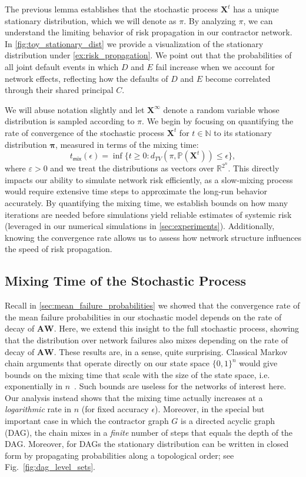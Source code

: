 \documentclass[mnsc,nonblindrev]{informs3}
\newcommand{\NN}{\mathbb{N}}
\renewcommand{\Pr}{\mathbb{P}}
\newcommand{\Xvec}{\mathbf{X}}
\newcommand{\A}{\mathbf{A}}
\newcommand{\W}{\mathbf{W}}
\newcommand{\pvec}{\mathbf{\pi}}
\newcommand{\tmix}{t_{\textsf{mix}}}
\begin{document}
    The previous lemma establishes that the stochastic process $\Xvec^t$ has a unique stationary distribution, which we will denote as $\pi$.  By analyzing $\pi$, we can understand the limiting behavior of risk propagation in our contractor network. In \cref{fig:toy_stationary_dist} we provide a visualization of the stationary distribution under \cref{ex:risk_propagation}.  We point out that the probabilities of all joint default events in which $D$ and $E$ fail increase when we account for network effects, reflecting how the defaults of $D$ and $E$ become correlated through their shared principal $C$.
    

    We will abuse notation slightly and let $\Xvec^\infty$ denote a random variable whose distribution is sampled according to $\pi$.  We begin by focusing on quantifying the rate of convergence of the stochastic process $\Xvec^{t}$ for $t \in \NN$ to its stationary distribution $\pvec$, measured in terms of the mixing time:
    \[
    \tmix(\epsilon) = \inf\{t \geq 0: d_{TV}(\pi, \Pr(\Xvec^t)) \leq \epsilon\},
    \]
    where $\varepsilon > 0$ and we treat the distributions as vectors over $\mathbb{R}^{2^n}$.  This directly impacts our ability to simulate network risk efficiently, as a slow-mixing process would require extensive time steps to approximate the long-run behavior accurately. By quantifying the mixing time, we establish bounds on how many iterations are needed before simulations yield reliable estimates of systemic risk (leveraged in our numerical simulations in \cref{sec:experiments}). Additionally, knowing the convergence rate allows us to assess how network structure influences the speed of risk propagation. %

\subsection{Mixing Time of the Stochastic Process}
\label{sec:mixing_time}

Recall in \cref{sec:mean_failure_probabilities} we showed that the convergence rate of the mean failure probabilities in our stochastic model depends on the rate of decay of $\A\W$.  Here, we extend this insight to the full stochastic process, showing that the distribution over network failures also mixes depending on the rate of decay of $\A\W$.  These results are, in a sense, quite surprising.
Classical Markov chain arguments that operate directly on our state space $\{0,1\}^n$ would give bounds on the mixing time that scale with the size of the state space, i.e. exponentially in $n$~\citep{resnick2013adventures}. Such bounds are useless for the networks of interest here. Our analysis instead shows that the mixing time actually increases at a \emph{logarithmic} rate in $n$ (for fixed accuracy $\epsilon$). Moreover, in the special but important case in which the contractor graph $G$ is a directed acyclic graph (DAG), the chain mixes in a \emph{finite} number of steps that equals the depth of the DAG. Moreover, for DAGs the stationary distribution can be written in closed form by propagating probabilities along a topological order; see Fig.~\ref{fig:dag_level_sets}.
\end{document}
